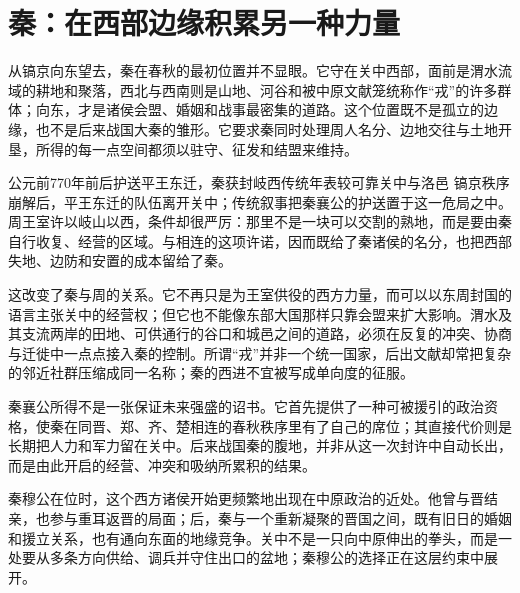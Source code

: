 \section{秦：在西部边缘积累另一种力量}

从镐京向东望去，秦在春秋的最初位置并不显眼。它守在关中西部，面前是渭水流域的耕地和聚落，西北与西南则是山地、河谷和被中原文献笼统称作“戎”的许多群体；向东，才是诸侯会盟、婚姻和战事最密集的道路。这个位置既不是孤立的边缘，也不是后来战国大秦的雏形。它要求秦同时处理周人名分、边地交往与土地开垦，所得的每一点空间都须以驻守、征发和结盟来维持。

\begin{event}{公元前770年前后}{护送平王东迁，秦获封岐西}{传统年表较可靠}{关中与洛邑}
镐京秩序崩解后，平王东迁的队伍离开关中；传统叙事把秦襄公的护送置于这一危局之中。周王室许以岐山以西，条件却很严厉：那里不是一块可以交割的熟地，而是要由秦自行收复、经营的区域。与相连的这项许诺，因而既给了秦诸侯的名分，也把西部失地、边防和安置的成本留给了秦。

这改变了秦与周的关系。它不再只是为王室供役的西方力量，而可以以东周封国的语言主张关中的经营权；但它也不能像东部大国那样只靠会盟来扩大影响。渭水及其支流两岸的田地、可供通行的谷口和城邑之间的道路，必须在反复的冲突、协商与迁徙中一点点接入秦的控制。所谓“戎”并非一个统一国家，后出文献却常把复杂的邻近社群压缩成同一名称；秦的西进不宜被写成单向度的征服。

秦襄公所得不是一张保证未来强盛的诏书。它首先提供了一种可被援引的政治资格，使秦在同晋、郑、齐、楚相连的春秋秩序里有了自己的席位；其直接代价则是长期把人力和军力留在关中。后来战国秦的腹地，并非从这一次封许中自动长出，而是由此开启的经营、冲突和吸纳所累积的结果。
\end{event}

秦穆公在位时，这个西方诸侯开始更频繁地出现在中原政治的近处。他曾与晋结亲，也参与重耳返晋的局面；后，秦与一个重新凝聚的晋国之间，既有旧日的婚姻和援立关系，也有通向东面的地缘竞争。关中不是一只向中原伸出的拳头，而是一处要从多条方向供给、调兵并守住出口的盆地；秦穆公的选择正在这层约束中展开。

